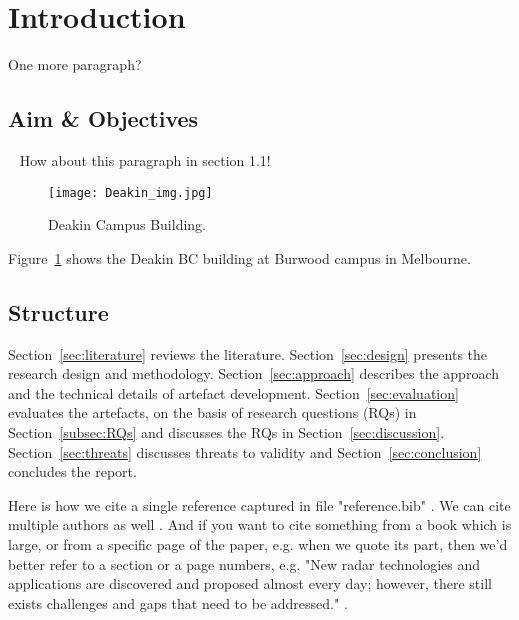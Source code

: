 \section{Introduction}
\label{sec:introduction}
One more paragraph?

\subsection{Aim \& Objectives}~\label{subsec:aims}
How about this paragraph in section 1.1!
\begin{figure}[h]
    \centering
    \texttt{[image: Deakin\_img.jpg]}
    \caption{Deakin Campus Building.}
    \label{fig:building}
\end{figure}

Figure~\ref{fig:building} shows the Deakin BC building at Burwood campus in Melbourne.

\subsection{Structure}\label{subsec:structure}
Section~\ref{sec:literature} reviews the literature. Section~\ref{sec:design} presents the research design and methodology. Section~\ref{sec:approach} describes the approach and the technical details of artefact development. Section~\ref{sec:evaluation} evaluates the artefacts, on the basis of research questions (RQs) in Section~\ref{subsec:RQs} and discusses the RQs in Section~\ref{sec:discussion}. Section~\ref{sec:threats} discusses threats to validity and Section~\ref{sec:conclusion} concludes the report. 

Here is how we cite a single reference captured in file "reference.bib" \cite{chief_introduction_2006}. We can cite multiple authors as well \cite{liu_radar_2021, zhou_survey_2020}. And if you want to cite something from a book which is large, or from a specific page of the paper, e.g. when we quote its part, then we'd better refer to  a section or a page numbers, e.g. "New radar technologies and applications are discovered and proposed almost every day; however, there still exists challenges and gaps that need to be addressed." \cite[p4]{gini_grand_2021}.
